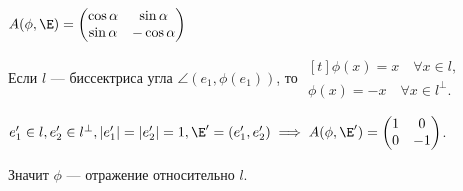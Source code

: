 \documentclass[a4paper]{article}
\begin{document}
\begin{colloq}
\begin{enumerate}
\begin{enumerate}
                    \begin{math}
                        A(\phi, \E) = \begin{pmatrix} \cos \alpha & \sin \alpha \\ \sin \alpha & -\cos \alpha \end{pmatrix}
                    \end{math}


                    Если {\color{red}$l$} --- биссектриса угла $\angle(e_1, \phi(e_1))$, то 
                    \begin{math}
                        \begin{gathered}[t]
                            \phi(x) = x \quad \forall x \in l, \\
                            \phi(x) = -x \quad \forall x \in l^{\perp}.
                        \end{gathered}
                    \end{math}

                    \bigskip
                    $e'_1 \in l, e'_2 \in l^{\perp}, |e'_1| = |e'_2| = 1, \E' = (e'_1, e'_2) \implies A(\phi, \E') = \begin{pmatrix} 1 & 0 \\ 0 & -1 \end{pmatrix}$.

                    Значит $\phi$ --- отражение относительно $l$.
                \end{enumerate}
            \end{enumerate}



\end{colloq}
\end{document}
